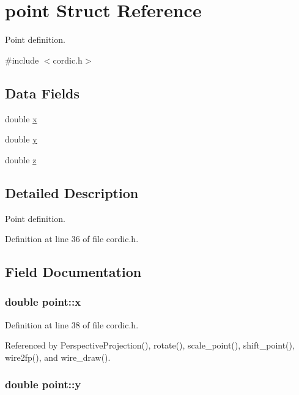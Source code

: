 \hypertarget{structpoint}{\section{point Struct Reference}
\label{structpoint}
}


Point definition.  




{\ttfamily \#include $<$cordic.\-h$>$}

\subsection*{Data Fields}
\begin{DoxyCompactItemize}
\item 
double \hyperlink{structpoint_a9c6b34deaf4900ad4193c17935fd384a}{x}
\item 
double \hyperlink{structpoint_a613f8f0d7352731638b0094e1b958b87}{y}
\item 
double \hyperlink{structpoint_aab1f0c3682401083b5bf252e7001874f}{z}
\end{DoxyCompactItemize}


\subsection{Detailed Description}
Point definition. 

Definition at line 36 of file cordic.\-h.



\subsection{Field Documentation}
\hypertarget{structpoint_a9c6b34deaf4900ad4193c17935fd384a}{
\subsubsection[{x}]{\setlength{\rightskip}{0pt plus 5cm}double point\-::x}}\label{structpoint_a9c6b34deaf4900ad4193c17935fd384a}


Definition at line 38 of file cordic.\-h.



Referenced by Perspective\-Projection(), rotate(), scale\-\_\-point(), shift\-\_\-point(), wire2fp(), and wire\-\_\-draw().

\hypertarget{structpoint_a613f8f0d7352731638b0094e1b958b87}{
\subsubsection[{y}]{\setlength{\rightskip}{0pt plus 5cm}double point\-::y}}\label{structpoint_a613f8f0d7352731638b0094e1b958b87}


